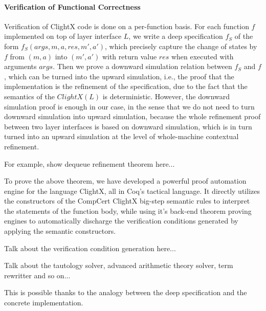 \paragraph{Verification of Functional Correctness}

Verification of ClightX code is done on a per-function basis.
For each function $f$ implemented on top of layer interface $L$, we write a deep specification
$f_S$ of the form $f_S(args,m,a,res, m',a')$, which precisely capture
the change of states by $f$ from $(m, a)$ into $(m', a')$ with
return value $res$ when executed with arguments $args$.
Then we prove a downward simulation relation between $f_S$ and $f$,
which can be turned into the upward simulation, i.e., the proof
that the implementation is the refinement of the specification,
due to the fact that the semantics of the $ClightX(L)$ is deterministic.
However, the downward simulation proof is enough in our case,
in the sense that we do not need to turn downward simulation into upward simulation,
because the whole refinement proof between two layer interfaces is based on downward simulation,
which is in turn turned into an upward simulation at the level of whole-machine contextual
refinement.

For example, show dequeue refinement theorem here...

To prove the above theorem, we have developed a powerful proof automation
engine for the language ClightX, all in Coq's tactical language.
It directly utilizes the constructors of the CompCert ClightX big-step
semantic rules to interpret the statements of the function body, while
using it's back-end theorem proving engines to automatically discharge
the verification conditions generated by applying the semantic constructors.

Talk about the verification condition generation here...

Talk about the tautology solver, advanced arithmetic theory solver, term rewritter and so on...

This is possible thanks to the analogy between the deep specification and the concrete
implementation.



